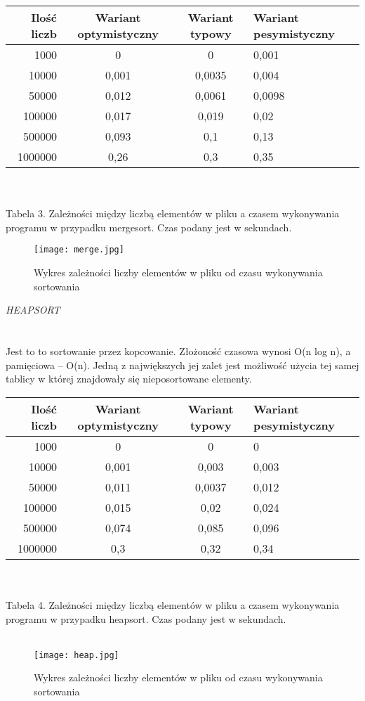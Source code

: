 \documentclass[11pt]{article}
\begin{document}
\begin{tabular}{|r|c|c|l|}
  \hline 
  \hline
  Ilość liczb  & Wariant optymistyczny & Wariant typowy & Wariant pesymistyczny  \\
  \hline
  1000 & 0 & 0 & 0,001  \\
  \hline
   10000 & 0,001 & 0,0035 & 0,004 \\
  \hline
   50000 & 0,012 & 0,0061 & 0,0098 \\
  \hline
  100000 & 0,017 & 0,019 & 0,02 \\
  \hline
   500000 & 0,093 & 0,1 & 0,13 \\
  \hline
   1000000 & 0,26 & 0,3 & 0,35 \\
  \hline
\end{tabular} 
\\ \\ Tabela 3. Zależności między liczbą elementów w pliku a czasem wykonywania programu w przypadku mergesort. Czas podany jest w sekundach.
\\
\begin{figure}[ht!]
\centering
\texttt{[image: merge.jpg]}
\caption{Wykres zależności liczby elementów w pliku od czasu wykonywania sortowania}
\label{overflow}
\end{figure}


\textit{HEAPSORT}
\\ \\ \\
Jest to to sortowanie przez kopcowanie. Złożoność czasowa wynosi  O(n log n), a pamięciowa – O(n). Jedną z największych jej zalet jest możliwość użycia tej samej tablicy w której znajdowały się nieposortowane elementy.

\begin{tabular}{|r|c|c|l|}
  \hline 
  \hline
  Ilość liczb  & Wariant optymistyczny & Wariant typowy & Wariant pesymistyczny  \\
  \hline
  1000 & 0 & 0 & 0  \\
  \hline
   10000 & 0,001 & 0,003 & 0,003 \\
  \hline
   50000 & 0,011 & 0,0037 & 0,012 \\
  \hline
  100000 & 0,015 & 0,02 & 0,024 \\
  \hline
   500000 & 0,074 & 0,085 & 0,096 \\
  \hline
   1000000 & 0,3 & 0,32 & 0,34 \\
  \hline
\end{tabular} 
\\ \\ Tabela 4. Zależności między liczbą elementów w pliku a czasem wykonywania programu w przypadku heapsort. Czas podany jest w sekundach.
\\ \\
\begin{figure}[ht!]
\centering
\texttt{[image: heap.jpg]}
\caption{Wykres zależności liczby elementów w pliku od czasu wykonywania sortowania}
\label{overflow}
\end{figure}
\\
\\ \\ \\ \\ \\ 
\end{document}
